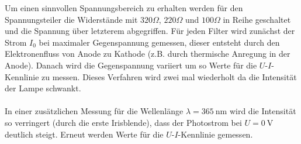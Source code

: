 Um einen sinnvollen Spannungsbereich zu erhalten werden für den Spannungsteiler die Widerstände mit $320\Omega$, $220\Omega$ und $100\Omega$ in Reihe geschaltet und die Spannung über letzterem abgegriffen. Für jeden Filter wird zunächst der Strom $I_0$ bei maximaler Gegenspannung gemessen, dieser entsteht durch den Elektronenfluss von Anode zu Kathode (z.B. durch thermische Anregung in der Anode). Danach wird die Gegenspannung variiert um so Werte für die $U$-$I$-Kennlinie zu messen. Dieses Verfahren wird zwei mal wiederholt da die Intensität der Lampe schwankt. \\ \\
In einer zusätzlichen Messung für die Wellenlänge $\lambda=\si{365 \ \nano \metre}$ wird die Intensität so verringert (durch die erste Irisblende), dass der Photostrom bei $U=\si{0 \ \volt}$ deutlich steigt. Erneut werden Werte für die $U$-$I$-Kennlinie gemessen.
